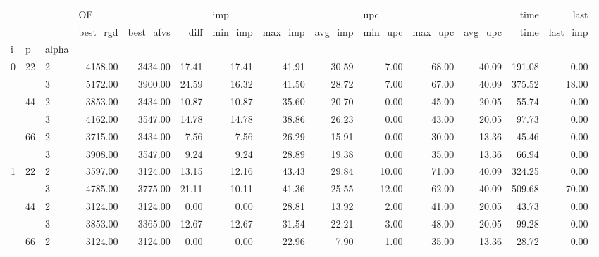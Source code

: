 \begin{tabular}{lllrrrrrrrrrrr}
\toprule
  &    &   & \multicolumn{3}{l}{OF} & \multicolumn{3}{l}{imp} & \multicolumn{3}{l}{upc} &    time &     last \\
  &    &   & best\_rgd & best\_afvs &  diff & min\_imp & max\_imp & avg\_imp & min\_upc & max\_upc & avg\_upc &    time & last\_imp \\
i & p & alpha &          &           &       &         &         &         &         &         &         &         &          \\
\midrule
\multirow{6}{*}{0} & \multirow{2}{*}{22} & 2 &  4158.00 &   3434.00 & 17.41 &   17.41 &   41.91 &   30.59 &    7.00 &   68.00 &   40.09 &  191.08 &     0.00 \\
  &    & 3 &  5172.00 &   3900.00 & 24.59 &   16.32 &   41.50 &   28.72 &    7.00 &   67.00 &   40.09 &  375.52 &    18.00 \\
\cline{2-14}
  & \multirow{2}{*}{44} & 2 &  3853.00 &   3434.00 & 10.87 &   10.87 &   35.60 &   20.70 &    0.00 &   45.00 &   20.05 &   55.74 &     0.00 \\
  &    & 3 &  4162.00 &   3547.00 & 14.78 &   14.78 &   38.86 &   26.23 &    0.00 &   43.00 &   20.05 &   97.73 &     0.00 \\
\cline{2-14}
  & \multirow{2}{*}{66} & 2 &  3715.00 &   3434.00 &  7.56 &    7.56 &   26.29 &   15.91 &    0.00 &   30.00 &   13.36 &   45.46 &     0.00 \\
  &    & 3 &  3908.00 &   3547.00 &  9.24 &    9.24 &   28.89 &   19.38 &    0.00 &   35.00 &   13.36 &   66.94 &     0.00 \\
\cline{1-14}
\cline{2-14}
\multirow{6}{*}{1} & \multirow{2}{*}{22} & 2 &  3597.00 &   3124.00 & 13.15 &   12.16 &   43.43 &   29.84 &   10.00 &   71.00 &   40.09 &  324.25 &     0.00 \\
  &    & 3 &  4785.00 &   3775.00 & 21.11 &   10.11 &   41.36 &   25.55 &   12.00 &   62.00 &   40.09 &  509.68 &    70.00 \\
\cline{2-14}
  & \multirow{2}{*}{44} & 2 &  3124.00 &   3124.00 &  0.00 &    0.00 &   28.81 &   13.92 &    2.00 &   41.00 &   20.05 &   43.73 &     0.00 \\
  &    & 3 &  3853.00 &   3365.00 & 12.67 &   12.67 &   31.54 &   22.21 &    3.00 &   48.00 &   20.05 &   99.28 &     0.00 \\
\cline{2-14}
  & \multirow{2}{*}{66} & 2 &  3124.00 &   3124.00 &  0.00 &    0.00 &   22.96 &    7.90 &    1.00 &   35.00 &   13.36 &   28.72 &     0.00 \\

\end{tabular}
